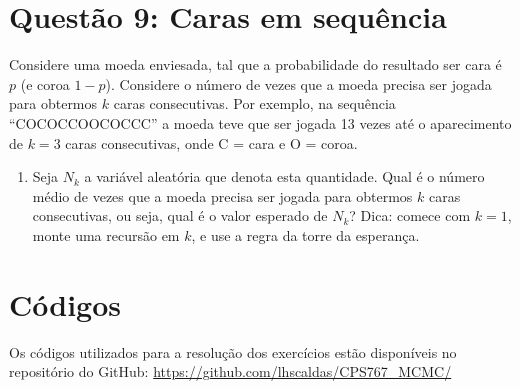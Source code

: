 \documentclass[12 pt]{article}
\begin{document}
\section*{Questão 9: Caras em sequência}
Considere uma moeda enviesada, tal que a probabilidade do resultado ser cara é $p$ (e coroa $1 - p$).
Considere o número de vezes que a moeda precisa ser jogada para obtermos $k$ caras consecutivas. Por exemplo, na sequência ``COCOCCOOCOCCC'' a moeda teve que ser jogada 13 vezes até o aparecimento de $k = 3$ caras consecutivas, onde C = cara e O = coroa.


\begin{enumerate}
    \item Seja $N_k$ a variável aleatória que denota esta quantidade. Qual é o número médio de vezes que a moeda precisa ser jogada para obtermos $k$ caras consecutivas, ou seja, qual é o valor esperado de $N_k$? Dica: comece com $k = 1$, monte uma recursão em $k$, e use a regra da torre da esperança.
    \begin{tcolorbox}[colframe=black, title=Resposta:]

    \end{tcolorbox}
\end{enumerate}

\section*{Códigos}

Os códigos utilizados para a resolução dos exercícios estão disponíveis no repositório do GitHub: \url{https://github.com/lhscaldas/CPS767_MCMC/}

\end{document}
